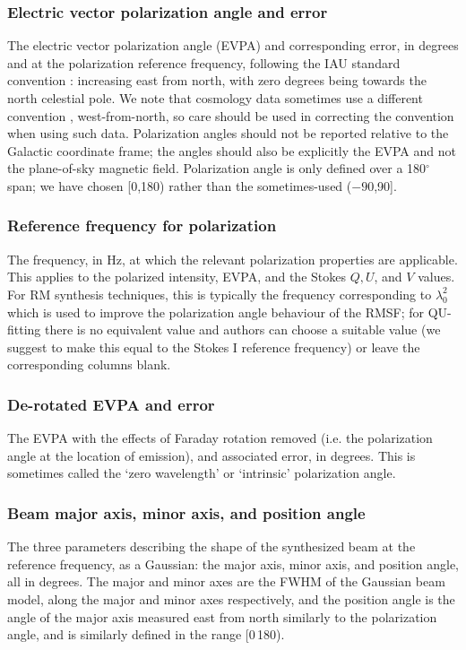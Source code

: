 \documentclass[10pt,modern]{aastex63}
\begin{document}
\subsubsection{Electric vector polarization angle and error}
The electric vector polarization angle (EVPA) and corresponding error, in degrees and at the polarization reference frequency, following the IAU standard convention \citep{IAU-polangle}: increasing east from north, with zero degrees being towards the north celestial pole. We note that cosmology data sometimes use a different convention \citep{deSeregoAlighieri2017}, west-from-north, so care should be used in correcting the convention when using such data. Polarization angles should not be reported relative to the Galactic coordinate frame; the angles should also be explicitly the EVPA and not the plane-of-sky magnetic field. Polarization angle is only defined over a 180$^\circ$ span; we have chosen [0\degr,180\degr) rather than the sometimes-used ($-90$\degr,90\degr].

\subsubsection{Reference frequency for polarization}
The frequency, in Hz, at which the relevant polarization properties are applicable. This applies to the polarized intensity, EVPA, and the Stokes $Q,U$, and $V$ values. For RM synthesis techniques, this is typically the frequency corresponding to $\lambda^2_0$ \citep{Brentjens2005} which is used to improve the polarization angle behaviour of the RMSF; for QU-fitting there is no equivalent value and authors can choose a suitable value (we suggest to make this equal to the Stokes I reference frequency) or leave the corresponding columns blank.

\subsubsection{De-rotated EVPA and error}
The EVPA with the effects of Faraday rotation removed (i.e. the polarization angle at the location of emission), and associated error, in degrees. This is sometimes called the `zero wavelength' or `intrinsic' polarization angle. 

\subsubsection{Beam major axis, minor axis, and position angle}
The three parameters describing the shape of the synthesized beam at the reference frequency, as a Gaussian: the major axis, minor axis, and position angle, all in degrees. The major and minor axes are the FWHM of the Gaussian beam model, along the major and minor axes respectively, and the position angle is the angle of the major axis measured east from north similarly to the polarization angle, and is similarly defined in the range [0\degr\,180\degr).
\end{document}
